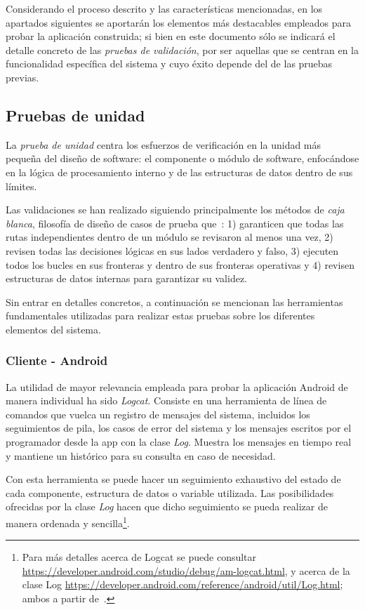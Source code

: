 Considerando el proceso descrito y las características mencionadas, en los apartados siguientes se aportarán los elementos más destacables empleados para probar la aplicación construida; si bien en este documento sólo se indicará el detalle concreto de las \emph{pruebas de validación}, por ser aquellas que se centran en la funcionalidad específica del sistema y cuyo éxito depende del de las pruebas previas.

\subsection{Pruebas de unidad}

La \emph{prueba de unidad} centra los esfuerzos de verificación en la unidad más pequeña del diseño de software: el componente o módulo de software, enfocándose en la lógica de procesamiento interno y de las estructuras de datos dentro de sus límites.

Las validaciones se han realizado siguiendo principalmente los métodos de \emph{caja blanca}, filosofía de diseño de casos de prueba que~\cite{Pre10}: 1) garanticen que todas las rutas independientes dentro de un módulo se revisaron al menos una vez, 2) revisen todas las decisiones lógicas en sus lados verdadero y falso, 3) ejecuten todos los bucles en sus fronteras y dentro de sus fronteras operativas y 4) revisen estructuras de datos internas para garantizar su validez.

Sin entrar en detalles concretos, a continuación se mencionan las herramientas fundamentales utilizadas para realizar estas pruebas sobre los diferentes elementos del sistema.

\subsubsection{Cliente - Android}

La utilidad de mayor relevancia empleada para probar la aplicación Android de manera individual ha sido \emph{Logcat}. Consiste en una herramienta de línea de comandos que vuelca un registro de mensajes del sistema, incluidos los seguimientos de pila, los casos de error del sistema y los mensajes escritos por el programador desde la app con la clase \emph{Log}. Muestra los mensajes en tiempo real y mantiene un histórico para su consulta en caso de necesidad.

Con esta herramienta se puede hacer un seguimiento exhaustivo del estado de cada componente, estructura de datos o variable utilizada. Las posibilidades ofrecidas por la clase \emph{Log} hacen que dicho seguimiento se pueda realizar de manera ordenada y sencilla\footnote{Para más detalles acerca de Logcat se puede consultar \url{https://developer.android.com/studio/debug/am-logcat.html}, y acerca de la clase Log \url{https://developer.android.com/reference/android/util/Log.html}; ambos a partir de~\cite{AnDev}.}.

